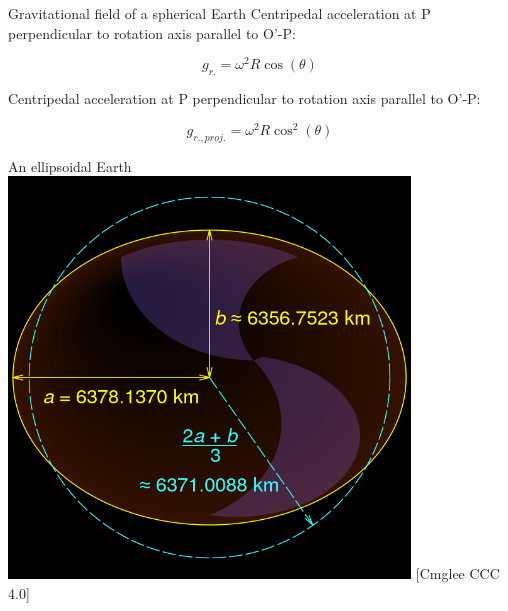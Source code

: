 \begin{frame}
\begin{PointSix}{Gravitational field of a spherical Earth}
  \small Centripedal acceleration at P perpendicular to rotation axis parallel to O'-P:

  $$
  g_{r.} = \omega^2 R \cos(\theta)
  $$

  \small Centripedal acceleration at P perpendicular to rotation axis parallel to O'-P:

  $$
  g_{r.,proj.} = \omega^2 R \cos^2(\theta)
  $$

\end{PointSix}
\end{frame}


\begin{frame}
\begin{PointSix}{An ellipsoidal Earth}
    \includegraphics[width=0.8\textwidth]{Figures/Gravity/Exported/WGS84_mean_Earth_radius_Cmglee_Reversed.png}
    \tiny [Cmglee CCC 4.0]
\end{PointSix}
\end{frame}


